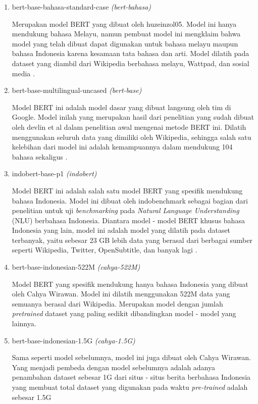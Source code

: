 \begin{enumerate}
    \item bert-base-bahasa-standard-case \textit{(bert-bahasa)}

          Merupakan model BERT yang dibuat oleh huzeinzol05. Model ini hanya mendukung bahasa Melayu, namun pembuat model ini mengklaim bahwa model yang telah dibuat dapat digunakan untuk bahasa melayu maupun bahasa Indonesia karena kesamaan tata bahasa dan arti. Model dilatih pada dataset yang diambil dari Wikipedia berbahasa melayu, Wattpad, dan sosial media \cite{Malaya}.

    \item bert-base-multilingual-uncased \textit{(bert-base)}

          Model BERT ini adalah model dasar yang dibuat langsung oleh tim di Google. Model inilah yang merupakan hasil dari penelitian yang sudah dibuat oleh devlin et al dalam penelitian awal mengenai metode BERT ini. Dilatih menggunakan seluruh data yang dimiliki oleh Wikipedia, sehingga salah satu kelebihan dari model ini adalah kemampuannya dalam mendukung 104 bahasa sekaligus \cite{devlin2019bert}.

    \item indobert-base-p1 \textit{(indobert)}

          Model BERT ini adalah salah satu model BERT yang spesifik mendukung bahasa Indonesia. Model ini dibuat oleh indobenchmark sebagai bagian dari penelitian untuk uji \textit{benchmarking} pada \textit{Natural Language Understanding} (NLU) berbahasa Indonesia. Diantara model - model BERT khusus bahasa Indonesia yang lain, model ini adalah model yang dilatih pada dataset terbanyak, yaitu sebesar 23 GB lebih data yang berasal dari berbagai sumber seperti Wikipedia, Twitter, OpenSubtitle, dan banyak lagi \cite{wilie2020indonlu}.

    \item bert-base-indonesian-522M \textit{(cahya-522M)}

          Model BERT yang spesifik mendukung hanya bahasa Indonesia yang dibuat oleh Cahya Wirawan. Model ini dilatih menggunakan 522M data yang semuanya berasal dari Wikipedia. Merupakan model dengan jumlah \textit{pretrained} dataset yang paling sedikit dibandingkan model - model yang lainnya.

    \item bert-base-indonesian-1.5G \textit{(cahya-1.5G)}

          Sama seperti model sebelumnya, model ini juga dibuat oleh Cahya Wirawan. Yang menjadi pembeda dengan model sebelumnya adalah adanya penambahan dataset sebesar 1G dari situs - situs berita berbahasa Indonesia yang membuat total dataset yang digunakan pada waktu \textit{pre-trained} adalah sebesar 1.5G

\end{enumerate}

